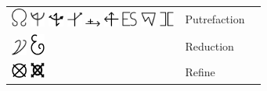 \documentclass[british,final,landscape]{scrartcl}
\begin{document}
\begin{refsection}
\begin{supertabular}{p{0.3\textwidth}p{0.34\textwidth}p{0.34\textwidth}}
   \includegraphics[width=5mm]{Process/Putrefaction1} \includegraphics[width=5mm]{Process/Putrefaction2} \includegraphics[width=5mm]{Process/Putrefaction3} \includegraphics[width=5mm]{Process/Putrefaction4} \includegraphics[width=5mm]{Process/Putrefaction5} \includegraphics[width=5mm]{Process/Putrefaction6} \includegraphics[width=5mm]{Process/Putrefaction7} \includegraphics[width=5mm]{Process/Putrefaction8} \includegraphics[width=5mm]{Process/Putrefaction9} & Putrefaction & \\
   \includegraphics[width=5mm]{Process/Reduction} \includegraphics[width=5mm]{Process/Reduction2} & Reduction & \\
   \includegraphics[width=5mm]{Process/Refine} \includegraphics[width=5mm]{Process/Refine2} & Refine & \\

\end{supertabular}
\end{refsection}
\end{document}

